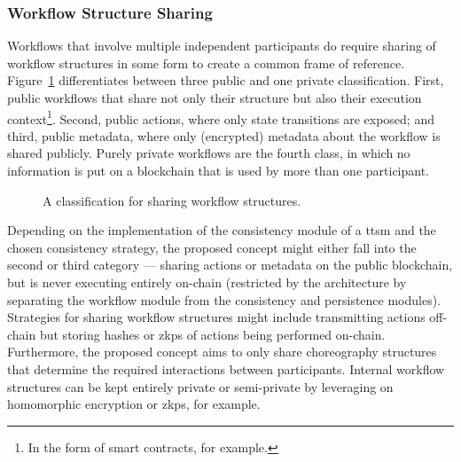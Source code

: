 \subsubsection{Workflow Structure Sharing} \label{sec:evaluation:qualitative_analysis:privacy_criteria:workflow_structure_sharing}
Workflows that involve multiple independent participants do require sharing of workflow structures in some form to create a common frame of reference. Figure~\ref{fig:evaluation:qualitative_analysis:workflow_structure_sharing_classes} differentiates between three public and one private classification. First, public workflows that share not only their structure but also their execution context\footnote{In the form of smart contracts, for example.}. Second, public actions, where only state transitions are exposed; and third, public metadata, where only (encrypted) metadata about the workflow is shared publicly. Purely private workflows are the fourth class, in which no information is put on a blockchain that is used by more than one participant.

\begin{figure}[h]
    \caption{A classification for sharing workflow structures.}
    \label{fig:evaluation:qualitative_analysis:workflow_structure_sharing_classes}
\end{figure}

Depending on the implementation of the consistency module of a \gls{ttsm} and the chosen consistency strategy, the proposed concept might either fall into the second or third category --- sharing actions or metadata on the public blockchain, but is never executing entirely on-chain (restricted by the architecture by separating the workflow module from the consistency and persistence modules). Strategies for sharing workflow structures might include transmitting actions off-chain but storing hashes or \glspl{zkp} of actions being performed on-chain. Furthermore, the proposed concept aims to only share choreography structures that determine the required interactions between participants. Internal workflow structures can be kept entirely private or semi-private by leveraging on homomorphic encryption or \glspl{zkp}, for example.

